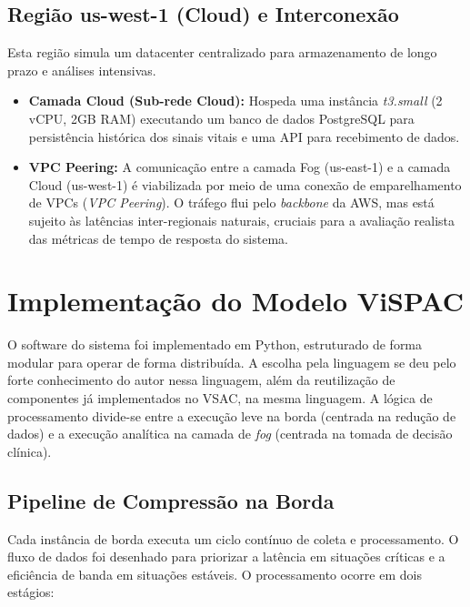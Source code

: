 \documentclass[twoside,english,brazilian]{UNISINOSmonografia}
\begin{document}
\subsection{Região us-west-1 (Cloud) e Interconexão}

Esta região simula um datacenter centralizado para armazenamento de longo prazo e análises intensivas.

\begin{itemize}
    \item \textbf{Camada Cloud (Sub-rede Cloud):} Hospeda uma instância \textit{t3.small} (2 vCPU, 2GB RAM) executando um banco de dados PostgreSQL para persistência histórica dos sinais vitais e uma API para recebimento de dados.
    \item \textbf{VPC Peering:} A comunicação entre a camada Fog (us-east-1) e a camada Cloud (us-west-1) é viabilizada por meio de uma conexão de emparelhamento de VPCs (\textit{VPC Peering}). O tráfego flui pelo \textit{backbone} da AWS, mas está sujeito às latências inter-regionais naturais, cruciais para a avaliação realista das métricas de tempo de resposta do sistema.
\end{itemize}

\section{Implementação do Modelo ViSPAC}

O software do sistema foi implementado em Python, estruturado de forma modular para operar de forma distribuída. A escolha pela linguagem se deu pelo forte conhecimento do autor nessa linguagem, além da reutilização de componentes já implementados no VSAC, na mesma linguagem. A lógica de processamento divide-se entre a execução leve na borda (centrada na redução de dados) e a execução analítica na camada de \textit{fog} (centrada na tomada de decisão clínica).

\subsection{Pipeline de Compressão na Borda}

Cada instância de borda executa um ciclo contínuo de coleta e processamento. O fluxo de dados foi desenhado para priorizar a latência em situações críticas e a eficiência de banda em situações estáveis. O processamento ocorre em dois estágios:
\end{document}
